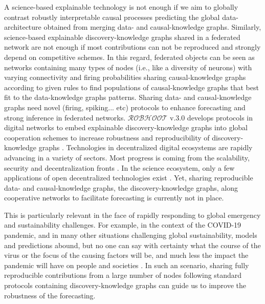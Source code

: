 \documentclass[11pt, a4paper]{article} %
\begin{document}
  A science-based explainable technology is not enough if we aim to
  globally contrast robustly interpretable causal processes predicting
  the global data-architecture obtained from merging data- and
  causal-knowledge graphs. Similarly, science-based explainable
  discovery-knowledge graphs shared in a federated network are not
  enough if most contributions can not be reproduced and strongly
  depend on competitive schemes. In this regard, federated objects can
  be seen as networks containing many types of nodes (i.e., like a
  diversity of neurons) with varying connectivity and firing
  probabilities \citep{Maass2014,Maass2015} sharing causal-knowledge
  graphs according to given rules to find populations of
  causal-knowledge graphs that best fit to the data-knowledge graphs
  patterns. Sharing data- and causal-knowledge graphs need novel
  (firing, spiking... etc) protocols to enhance forecasting and strong
  inference in federated networks. $\mathcal{ROBHOOT}$ v.3.0 develops
  protocols in digital networks to embed explainable
  discovery-knowledge graphs into global cooperation schemes to
  increase robustness and reproducibility of discovery-knowledge graphs
  \citep{Dilley2016}. Technologies in decentralized digital ecosystems
  are rapidly advancing in a variety of sectors. Most progress is
  coming from the scalability, security and decentralization fronts
  \citep{Golem2016,Dilley2016,Durov2017,Androulaki2018,OceanProtocolFoundation2018,BigchainDBGmbH2018}. In
  the science ecosystem, only a few applications of open decentralized
  technologies exist \citep{Gunther2018}. Yet, sharing reproducible
  data- and causal-knowledge graphs, the discovery-knowledge graphs,
  along cooperative networks to facilitate forecasting is currently
  not in place.

  This is particularly relevant in the face of rapidly responding to
  global emergency and sustainability challenges. For example, in the
  context of the COVID-19 pandemic, and in many other situations
  challenging global sustainability, models and predictions abound,
  but no one can say with certainty what the course of the virus or
  the focus of the causing factors will be, and much less the impact
  the pandemic will have on people and societies
  \citep{Deloitte2020}. In such an scenario, sharing fully
  reproducible contributions from a large number of nodes following
  standard protocols containing discovery-knowledge graphs can guide
  us to improve the robustness of the forecasting.
  
\end{document}
